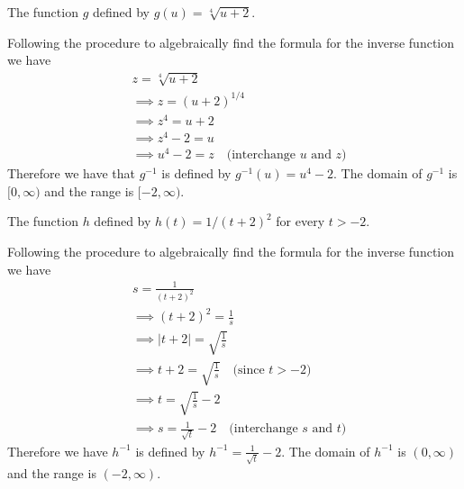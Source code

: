\documentclass[nooutcomes]{ximera}
\renewenvironment{freeResponse}{
\ifhandout\setbox0\vbox\bgroup\else
\begin{trivlist}\item[\hskip \labelsep\bfseries Solution:\hspace{2ex}]
\fi}
{\ifhandout\egroup\else
\end{trivlist}
\fi}
\begin{document}
\begin{problem}
\begin{itemize}
    \item[(b)]
      The function $g$ defined by $g(u) = \sqrt[4]{u + 2}$.
      \begin{freeResponse}
        Following the procedure to algebraically find the formula for the inverse function we have
        \begin{align*}
          &\mbox{} z = \sqrt[4]{u + 2}\\
          &\implies z = (u+2)^{1/4}\\
          &\implies z^4 = u + 2\\
          &\implies z^4 - 2 = u\\
          &\implies u^4 - 2 = z \hspace{1em} \mbox{(interchange $u$ and $z$)}
        \end{align*}
        Therefore we have that $g^{-1}$ is defined by $g^{-1}(u) = u^4 - 2$.
        The domain of $g^{-1}$ is $[0, \infty)$ and the range is $[-2, \infty)$.
      \end{freeResponse}

    \item[(c)]
      The function $h$ defined by $h(t) = 1/(t+2)^2$ for every $t > -2$.
      \begin{freeResponse}
        Following the procedure to algebraically find  the formula for the inverse function we have
        \begin{align*}
          &\mbox{} s = \frac{1}{(t+2)^2}\\
          &\implies (t+2)^2 = \frac{1}{s}\\
          &\implies |t + 2| = \sqrt{\frac{1}{s}} \\
          &\implies t + 2 = \sqrt{\frac{1}{s}} \hspace{1em} \mbox{(since $t > -2$)}\\
          &\implies t = \sqrt{\frac{1}{s}} - 2 \\
          &\implies s = \frac{1}{\sqrt{t}} - 2 \hspace{1em} \mbox{(interchange $s$ and $t$)}
        \end{align*}
        Therefore we have $h^{-1}$ is defined by $h^{-1} = \frac{1}{\sqrt{t}} - 2$.
        The domain of $h^{-1}$ is $(0, \infty)$ and the range is $(-2, \infty)$.
      \end{freeResponse}


\end{itemize}
\end{problem}
\end{document}
